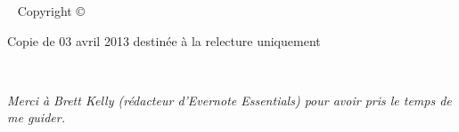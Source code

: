 



\frontmatter

\blankpage

\maketitle


\newpage
\begin{fullwidth}
~\vfill
\thispagestyle{empty}
\setlength{\parindent}{0pt}
\setlength{\parskip}{\baselineskip}
Copyright \copyright\ \the\year\ \thanklessauthor

\par{}

\par{}

\par Copie de 03 avril 2013 destinée à la relecture uniquement

\end{fullwidth}

\tableofcontents

\listoffigures

\listoftables

\cleardoublepage
~\vfill
\begin{doublespace}
\noindent\fontsize{18}{22}\selectfont\itshape
\nohyphenation
Merci à Brett Kelly (rédacteur d'Evernote Essentials) pour avoir pris le temps de me guider.
\end{doublespace}
\vfill
\vfill

\cleardoublepage



\mainmatter









\printindex


